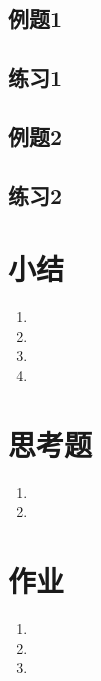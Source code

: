 \begin{CJK}{UTF8}{gkai}
\subsection{例题1}

\subsection{练习1}

\subsection{例题2}

\subsection{练习2}

\section{小结}
\begin{enumerate}
\item
\item
\item
\item 
\end{enumerate}

\section{思考题}
\begin{enumerate}
\item
\item 
\end{enumerate}

\section{作业}
\begin{enumerate}
\item
\item
\item 
\end{enumerate}


\end{CJK}
